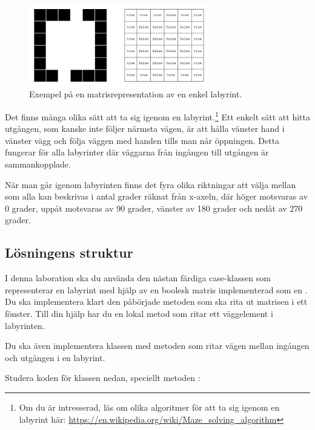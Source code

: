 \begin{figure}[h]
	\begin{center}
		\includegraphics[width=0.7\textwidth]{../img/w09-lab/MazeAndMatrix.jpg}
	\end{center}
	\caption{Exempel på en matrisrepresentation av en enkel labyrint.}
	\label{maze:figboolmatrix}
\end{figure}

Det finns många olika sätt att ta sig igenom en labyrint.\footnote{Om du är intresserad, läs om olika algoritmer för att ta sig igenom en labyrint här: \url{https://en.wikipedia.org/wiki/Maze\_solving\_algorithm}} Ett enkelt sätt att hitta utgången, som kanske inte följer närmsta vägen, är att hålla vänster hand i vänster vägg och följa väggen med handen tills man når öppningen. Detta fungerar för alla labyrinter där väggarna från ingången till utgången är sammankopplade.

När man går igenom labyrinten finns det fyra olika riktningar att välja mellan som alla kan beskrivas i antal grader räknat från x-axeln, där höger motsvaras av 0 grader, uppåt motsvaras av 90 grader, vänster av 180 grader och nedåt av 270 grader.

\subsection{Lösningens struktur}

I denna laboration ska du använda den nästan färdiga case-klassen  som representerar en labyrint med hjälp av en boolesk matris implementerad som en .
Du ska implementera klart den påbörjade metoden  som ska rita ut matrisen i ett fönster. Till din hjälp har du en lokal metod som ritar ett väggelement i labyrinten.

Du ska även implementera klassen  med metoden  som ritar vägen mellan ingången och utgången i en labyrint.

Studera koden för klassen  nedan, speciellt metoden :

